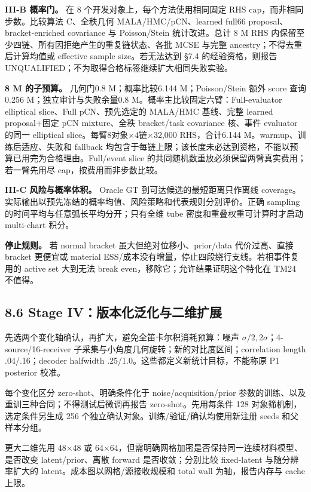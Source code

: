 \documentclass[
  11pt,
  a4paper,
]{article}
\begin{document}
\textbf{III-B 概率门。} 在 8 个开发对象上，每个方法使用相同固定 RHS
cap，而非相同步数。比较算法 C、全秩几何 MALA/HMC/pCN、learned full66
proposal、bracket-enriched covariance 与 Poisson/Stein 统计改进。总计 8
M RHS 内保留至少四链、所有因拒绝产生的重复链状态、各批 MCSE 与完整
ancestry；不得去重后计算均值或 effective sample size。若无法达到 §7.4
的经验资格，则报告 UNQUALIFIED；不为取得合格标签继续扩大相同失败实验。

\textbf{8 M 的子预算。} 几何门0.8 M；概率比较6.144 M；Poisson/Stein 额外
score 查询0.256 M；独立审计与失败余量0.8
M。概率主比较固定六臂：Full-evaluator elliptical slice、Full
pCN、预先选定的 MALA/HMC 基线、完整 learned proposal+固定 pCN
mixture、全秩 bracket/task covariance 核、事件 evaluator 的同一
elliptical slice。每臂8对象×4链×32,000 RHS，合计6.144
M。warmup、训练后适应、失败和 fallback
均包含于每链上限；该长度未必达到资格，不能以预算已用完为合格理由。Full/event
slice 的共同随机数重放必须保留两臂真实费用；若一臂先用尽
cap，按费用而非步数比较。

\textbf{III-C 风险与概率体积。} Oracle GT 到可达候选的最短距离只作离线
coverage。实际输出以预先冻结的概率均值、风险策略和代表规则分别评价。正确
sampling 的时间平均与任意弧长平均分开；只有全维 tube
密度和重叠权重可计算时才启动 multi-chart 积分。

\textbf{停止规则。} 若 normal bracket 虽大但绝对位移小、prior/data
代价过高、直接 bracket 更便宜或 material
ESS/成本没有增量，停止四段绕行支线。若相事件复用的 active set 大到无法
break even，移除它；允许结果证明这个特化在 TM24 不值得。

\hypertarget{stage-ivux7248ux672cux5316ux6cdbux5316ux4e0eux4e8cux7ef4ux6269ux5c55}{%
\subsection{8.6 Stage
IV：版本化泛化与二维扩展}\label{stage-ivux7248ux672cux5316ux6cdbux5316ux4e0eux4e8cux7ef4ux6269ux5c55}}

先选两个变化轴确认，再扩大，避免全笛卡尔积消耗预算：噪声
\(\sigma/2,2\sigma\)；4-source/16-receiver
子采集与小角度几何旋转；新的对比度区间；correlation length
.04/.16；decoder halfwidth .25/1.0。这些都定义新统计目标，不能称原 P1
posterior 校准。

每个变化区分 zero-shot、明确条件化于 noise/acquisition/prior
参数的训练、以及重训三种合同；不得测试后微调再报告 zero-shot。先用每条件
128 对象筛机制，选定条件另生成 256
个独立确认对象。训练/验证/确认均使用新注册 seeds 和父样本分组。

更大二维先用 48×48 或
64×64，但需明确网格加密是否保持同一连续材料模型、是否改变
latent/prior、离散 forward 是否收敛；分别比较 fixed-latent
与随分辨率扩大的 latent。成本图以网格/源接收规模和 total wall
为轴，报告内存与 cache 上限。
\end{document}
